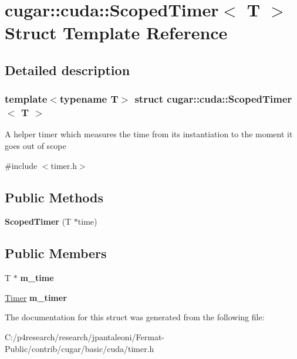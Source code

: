 \hypertarget{structcugar_1_1cuda_1_1_scoped_timer}{}\section{cugar\+:\+:cuda\+:\+:Scoped\+Timer$<$ T $>$ Struct Template Reference}
\label{structcugar_1_1cuda_1_1_scoped_timer}


\subsection{Detailed description}
\subsubsection*{template$<$typename T$>$\newline
struct cugar\+::cuda\+::\+Scoped\+Timer$<$ T $>$}

A helper timer which measures the time from its instantiation to the moment it goes out of scope 

{\ttfamily \#include $<$timer.\+h$>$}

\subsection*{Public Methods}
\begin{DoxyCompactItemize}
\item 
\mbox{\label{structcugar_1_1cuda_1_1_scoped_timer_afd3ae70ca58a604966481ee22b243dda}} 
{\bfseries Scoped\+Timer} (T $\ast$time)
\end{DoxyCompactItemize}
\subsection*{Public Members}
\begin{DoxyCompactItemize}
\item 
\mbox{\label{structcugar_1_1cuda_1_1_scoped_timer_ae7dae4a036417d099e7115713cfedd8a}} 
T $\ast$ {\bfseries m\+\_\+time}
\item 
\mbox{\label{structcugar_1_1cuda_1_1_scoped_timer_a9f568c63ab953439cd7f6cf1fc764395}} 
\hyperlink{structcugar_1_1cuda_1_1_timer}{Timer} {\bfseries m\+\_\+timer}
\end{DoxyCompactItemize}


The documentation for this struct was generated from the following file\+:\begin{DoxyCompactItemize}
\item 
C\+:/p4research/research/jpantaleoni/\+Fermat-\/\+Public/contrib/cugar/basic/cuda/timer.\+h\end{DoxyCompactItemize}
